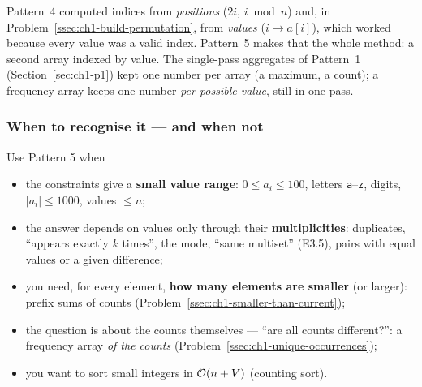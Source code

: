 Pattern~4 computed indices from \emph{positions} ($2i$, $i \bmod n$) and, in Problem~\ref{ssec:ch1-build-permutation}, from \emph{values} ($i \to a[i]$), which worked because every value was a valid index. Pattern~5 makes that the whole method: a second array indexed by value. The single-pass aggregates of Pattern~1 (Section~\ref{sec:ch1-p1}) kept one number per array (a maximum, a count); a frequency array keeps one number \emph{per possible value}, still in one pass.

\begin{diagrambox}
\end{diagrambox}

\subsubsection*{When to recognise it --- and when not}

Use Pattern 5 when
\begin{itemize}[leftmargin=*]
    \item the constraints give a \textbf{small value range}: $0 \le a_i \le 100$, letters \texttt{a}--\texttt{z}, digits, $|a_i| \le 1000$, values $\le n$;
    \item the answer depends on values only through their \textbf{multiplicities}: duplicates, ``appears exactly $k$ times'', the mode, ``same multiset'' (E3.5), pairs with equal values or a given difference;
    \item you need, for every element, \textbf{how many elements are smaller} (or larger): prefix sums of counts (Problem~\ref{ssec:ch1-smaller-than-current});
    \item the question is about the counts themselves --- ``are all counts different?'': a frequency array \emph{of the counts} (Problem~\ref{ssec:ch1-unique-occurrences});
    \item you want to sort small integers in $\mathcal{O}(n + V)$ (counting sort).
\end{itemize}


